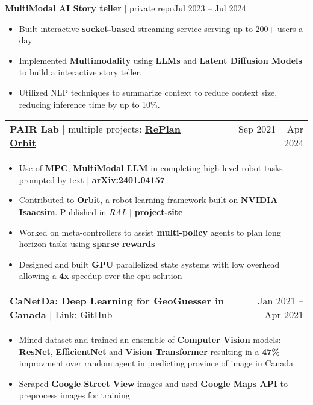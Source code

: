 \documentclass[letterpaper,11pt]{article}
\makeatletter
\newcommand{\resumeItem}[1]{
  \item\small{
    {#1 \vspace{-2pt}}
  }
}
\newcommand{\resumeProjectHeading}[2]{
    \item
    \begin{tabular*}{0.97\textwidth}{l@{\extracolsep{\fill}}r}
      \small#1 & #2 \\
    \end{tabular*}\vspace{-9pt}
}
\newcommand{\resumeItemListStart}{\begin{itemize}}
\newcommand{\resumeItemListEnd}{\end{itemize}\vspace{-7pt}}
\makeatother
\begin{document}
          {\textbf{MultiModal AI Story teller}  $|$ private repo}{Jul 2023 -- Jul 2024}
          \resumeItemListStart
            \resumeItem{Built interactive \textbf{socket-based} streaming service serving up to 200+ users a day.}
            \resumeItem{Implemented \textbf{Multimodality} using \textbf{LLMs} and \textbf{Latent Diffusion Models} to build a interactive story teller.}
            \resumeItem{Utilized NLP techniques to summarize context to reduce context size, reducing inference time by up to 10\%.}
          \resumeItemListEnd
      \resumeProjectHeading
      {\textbf{PAIR Lab} | multiple projects: \href{https://arxiv.org/abs/2401.04157}{\textbf{RePlan}}  $|$ \href{https://isaac-orbit.github.io/}{\textbf{Orbit}}}{Sep 2021 -- Apr 2024}
        \resumeItemListStart
          \resumeItem{Use of \textbf{MPC}, \textbf{MultiModal LLM} in completing high level robot tasks prompted by text $|$ \href{https://arxiv.org/abs/2401.04157}{\textbf{arXiv:2401.04157}}}
          \resumeItem{Contributed to \textbf{Orbit}, a robot learning framework built on \textbf{NVIDIA Isaacsim}. Published in \textit{RAL} $|$ \href{https://isaac-orbit.github.io/}{\textbf{project-site}}}
          \resumeItem{Worked on meta-controllers to assist \textbf{multi-policy} agents to plan long horizon tasks using \textbf{sparse rewards}}
          \resumeItem{Designed and built \textbf{GPU} parallelized state systems with low overhead allowing a \textbf{4x} speedup over the cpu solution}
        \resumeItemListEnd
      \resumeProjectHeading
          {\textbf{CaNetDa: Deep Learning for GeoGuesser in Canada} $|$ Link: \href{https://github.com/st-tran/CSC413-Project}{GitHub}}{Jan 2021 -- Apr 2021}
          \resumeItemListStart
            \resumeItem{Mined dataset and trained an ensemble of \textbf{Computer Vision} models: \textbf{ResNet}, \textbf{EfficientNet} and \textbf{Vision Transformer} resulting in a \textbf{47\%} improvment over random agent in predicting province of image in Canada}
            \resumeItem{Scraped \textbf{Google Street View} images and used \textbf{Google Maps API} to preprocess images for training}
          \resumeItemListEnd
\end{document}
